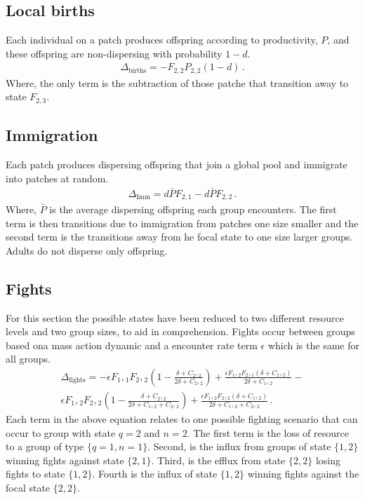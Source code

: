 \subsection{Local births}
Each individual on a patch produces offspring according to productivity, $P$, and these offspring are non-dispersing with probability $1-d$.
\begin{align}
    \Delta_{\text{births}} = - F_{2,2} P_{2,2} \left( 1 - d \right)\,.
\end{align}
Where, the only term is the subtraction of those patche that transition away to state $F_{2,3}$. 

\subsection{Immigration}
Each patch produces dispersing offspring that join a global pool and immigrate into patches at random. 
\begin{align}
    \Delta_{\text{Imm}} = d \bar{P} F_{2,1} - d \bar{P} F_{2,2}\,.
\end{align}
Where, $\bar{P}$ is the average dispersing offspring each group encounters. The first term is then transitions due to immigration from patches one size smaller and the second term is the transitions away from he focal state to one size larger groups. Adults do not disperse only offspring.

\subsection{Fights}
For this section the possible states have been reduced to two different resource levels and two group sizes, to aid in comprehension. Fights occur between groups based ona  mass action dynamic and a encounter rate term $\epsilon$ which is the same for all groups. 
\begin{multline}
    \Delta_{\text{fights}} = - \epsilon F{{_1}},{_1} F{{_2}},{_2} \left( 1 - \frac{\delta + C{{_2}},{_2}}{2\delta + C{{_2}},{_2}} \right) + \frac{\epsilon F{{_1}},{_2} F{{_2}},{_1} \left( \delta + C{{_1}},{_2} \right)}{2\delta + C{{_1}},{_2}} - \\ 
    \epsilon F{{_1}},{_2} F{{_2}},{_2} \left( 1 - \frac{\delta + C{{_2}},{_2}}{2\delta + C{{_1}},{_2} + C{{_2}},{_2}} \right) + \frac{\epsilon F{{_1}},{_2} F{{_2}},{_2} \left( \delta + C{{_1}},{_2} \right)}{2\delta + C{{_1}},{_2} + C{{_2}},{_2}}\,.
\end{multline}
Each term in the above equation relates to one possible fighting scenario that can occur to group with state $q=2$ and $n=2$. The first term is the loss of resource to a group of type $\{q=1,n=1\}$. Second, is the influx from groups of state $\{1,2\}$ winning fights against state $\{2,1\}$. Third, is the efflux from state $\{2,2\}$ losing fights to state $\{1,2\}$. Fourth is the influx of state $\{1,2\}$ winning fights against the focal state $\{2,2\}$. 
    